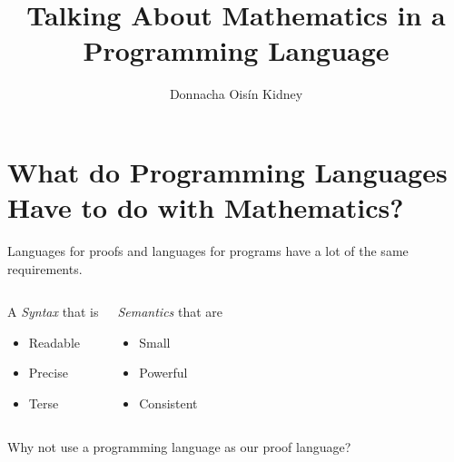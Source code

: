 \documentclass[usenames,dvipsnames]{beamer}
\title{Talking About Mathematics in a Programming Language}
\author{Donnacha Oisín Kidney}
\begin{document}
\maketitle
\tableofcontents

\section{What do Programming Languages Have to do with Mathematics?}
\begin{frame}
  Languages for proofs and languages for programs have a lot of the same requirements.

  \pause
  \begin{columns}[T]
    \begin{block}{A \emph{Syntax} that is}
      \begin{itemize}
        \item Readable
        \item Precise
        \item Terse
      \end{itemize}
    \end{block}
    \pause
    \begin{block}{\emph{Semantics} that are}
      \begin{itemize}
        \item Small
        \item Powerful
        \item Consistent
      \end{itemize}
    \end{block}
  \end{columns}
\end{frame}
\begin{frame}[standout]
  Why not use a programming language as our proof language?
\end{frame}
\end{document}
